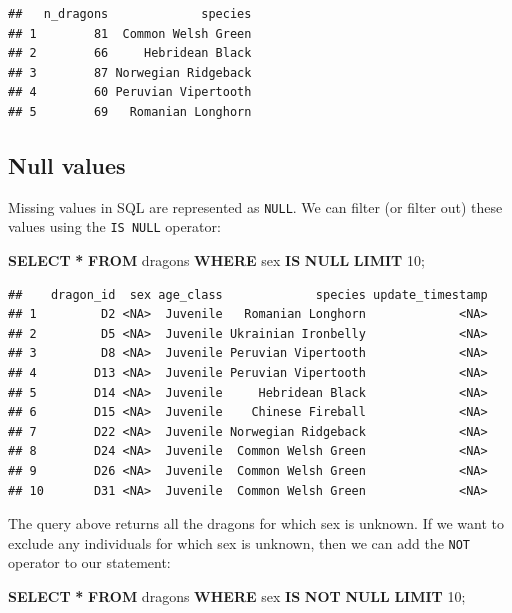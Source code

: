 \documentclass[
]{book}
\newenvironment{Shaded}{\begin{snugshade}}{\end{snugshade}}
\newcommand{\DecValTok}[1]{\textcolor[rgb]{0.00,0.00,0.81}{#1}}
\newcommand{\KeywordTok}[1]{\textcolor[rgb]{0.13,0.29,0.53}{\textbf{#1}}}
\newcommand{\NormalTok}[1]{#1}
\newcommand{\OperatorTok}[1]{\textcolor[rgb]{0.81,0.36,0.00}{\textbf{#1}}}
\begin{document}
\begin{verbatim}
##   n_dragons             species
## 1        81  Common Welsh Green
## 2        66     Hebridean Black
## 3        87 Norwegian Ridgeback
## 4        60 Peruvian Vipertooth
## 5        69   Romanian Longhorn
\end{verbatim}

\hypertarget{null-values}{%
\subsection{Null values}\label{null-values}}

Missing values in SQL are represented as \texttt{NULL}. We can filter (or filter out)
these values using the \texttt{IS\ NULL} operator:

\begin{Shaded}
\begin{Highlighting}[]
\KeywordTok{SELECT} \OperatorTok{*} 
\KeywordTok{FROM}\NormalTok{ dragons}
\KeywordTok{WHERE}\NormalTok{ sex }\KeywordTok{IS} \KeywordTok{NULL}
\KeywordTok{LIMIT} \DecValTok{10}\NormalTok{;}
\end{Highlighting}
\end{Shaded}

\begin{verbatim}
##    dragon_id  sex age_class             species update_timestamp
## 1         D2 <NA>  Juvenile   Romanian Longhorn             <NA>
## 2         D5 <NA>  Juvenile Ukrainian Ironbelly             <NA>
## 3         D8 <NA>  Juvenile Peruvian Vipertooth             <NA>
## 4        D13 <NA>  Juvenile Peruvian Vipertooth             <NA>
## 5        D14 <NA>  Juvenile     Hebridean Black             <NA>
## 6        D15 <NA>  Juvenile    Chinese Fireball             <NA>
## 7        D22 <NA>  Juvenile Norwegian Ridgeback             <NA>
## 8        D24 <NA>  Juvenile  Common Welsh Green             <NA>
## 9        D26 <NA>  Juvenile  Common Welsh Green             <NA>
## 10       D31 <NA>  Juvenile  Common Welsh Green             <NA>
\end{verbatim}

The query above returns all the dragons for which sex is unknown. If we want to
exclude any individuals for which sex is unknown, then we can add the \texttt{NOT}
operator to our statement:

\begin{Shaded}
\begin{Highlighting}[]
\KeywordTok{SELECT} \OperatorTok{*} 
\KeywordTok{FROM}\NormalTok{ dragons}
\KeywordTok{WHERE}\NormalTok{ sex }\KeywordTok{IS} \KeywordTok{NOT} \KeywordTok{NULL}
\KeywordTok{LIMIT} \DecValTok{10}\NormalTok{;}
\end{Highlighting}
\end{Shaded}
\end{document}
